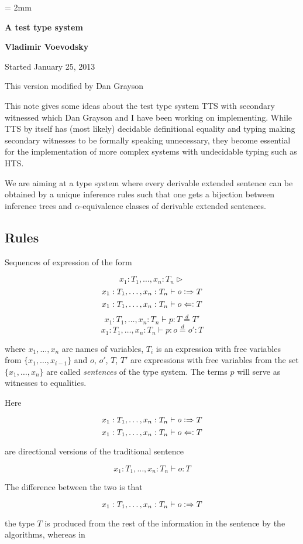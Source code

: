 \documentclass[11pt]{article}
\newcommand{\eqd}{\stackrel{d}{=}}
\newcommand{\synth}{\vcentcolon\Rightarrow}
\newcommand{\force}{\Leftarrow\vcentcolon}
\begin{document}
\parskip = 2mm
\begin{center}
{\bf\Large A test type system}

{\bf Vladimir Voevodsky}

{Started January 25, 2013}  

{This version modified by Dan Grayson}  
\end{center}

\tableofcontents

This note gives some ideas about the test type system TTS with secondary
witnessed which Dan Grayson and I have been working on implementing. While TTS
by itself has (most likely) decidable definitional equality and typing making
secondary witnesses to be formally speaking unnecessary, they become essential
for the implementation of more complex systems with undecidable typing such as
HTS.

We are aiming at a type system where every derivable extended sentence can be
obtained by a unique inference rules such that one gets a bijection between
inference trees and $\alpha$-equivalence classes of derivable extended
sentences.

\subsection{Rules}

Sequences of expression of the form

$$x_1:T_1,\dots,x_n:T_n\rhd$$
$$x_1:T_1,\dots,x_n:T_n\vdash o \synth T$$
$$x_1:T_1,\dots,x_n:T_n\vdash o \force T$$
$$x_1:T_1,\dots,x_n:T_n\vdash p : T \eqd T'$$ 
$$x_1:T_1,\dots,x_n:T_n\vdash p : o \eqd o' : T$$

where $x_1,\dots,x_n$ are names of variables, $T_i$ is an expression with free
variables from $\{x_1,\dots,x_{i-1}\}$ and $o$, $o'$, $T$, $T'$ are expressions
with free variables from the set $\{x_1,\dots,x_n\}$ are called {\em sentences}
of the type system.  The terms $p$ will serve as witnesses to equalities.

Here

$$x_1:T_1,\dots,x_n:T_n\vdash o \synth T$$
$$x_1:T_1,\dots,x_n:T_n\vdash o \force T$$

are directional versions of the traditional sentence

$$x_1:T_1,\dots,x_n:T_n\vdash o : T$$

The difference between the two is that 

$$x_1:T_1,\dots,x_n:T_n\vdash o \synth T$$

the type $T$ is produced from the rest of the information in the sentence by
the algorithms, whereas in 
\end{document}
